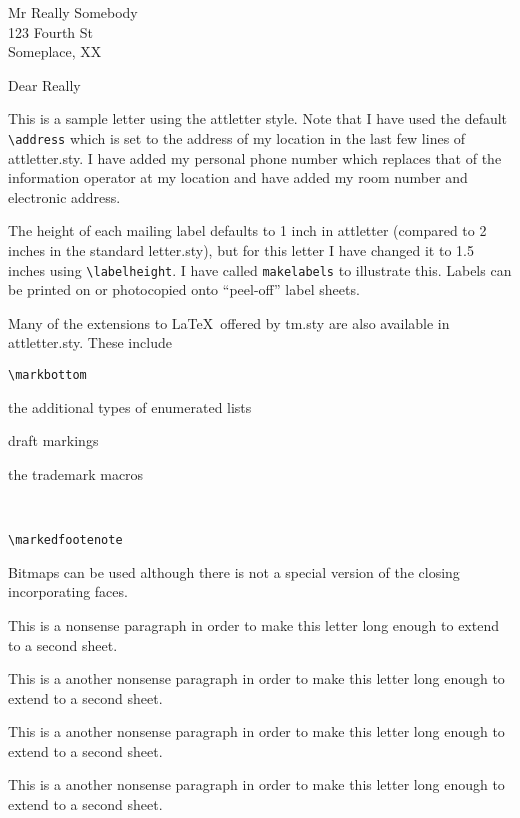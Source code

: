 %
\date{January 16, 1989}
\makelabels
{}
\signature{Terry L Anderson\\Author of attletter.sty}

\begin{letter}{Mr Really Somebody\\123 Fourth St\\Someplace, XX}
\opening{Dear Really}
This is a sample letter using the attletter style.  Note that I have
used the default \verb|\address| which is set to the address of my
location in the last few lines of attletter.sty.  I have added my
personal phone number which replaces that of the information operator
at my location and have added my room number and electronic address.

The height of each mailing label defaults to 1 inch in attletter
(compared to 2 inches in the standard letter.sty), but for this letter
I have changed it to 1.5 inches using \verb|\labelheight|.  I have
called \verb|makelabels| to illustrate this.  Labels can be printed on
or photocopied onto ``peel-off'' label sheets.

Many of the extensions to \LaTeX\ offered by tm.sty are also available
in attletter.sty.  These include 
\begin{alphenum}
\item \verb|\markbottom|
\item the additional types of enumerated lists
\item draft markings
\item the trademark macros
\item \UNIX\
\item \verb|\markedfootenote|
\end{alphenum}

Bitmaps can be used although there is not a special version of the
closing incorporating faces.  

This is a nonsense paragraph in order to make this letter long enough
to extend to a second sheet.

This is a another nonsense paragraph in order to make this letter long enough
to extend to a second sheet.

This is a another nonsense paragraph in order to make this letter long enough
to extend to a second sheet.

This is a another nonsense paragraph in order to make this letter long enough
to extend to a second sheet.


\end{letter}
